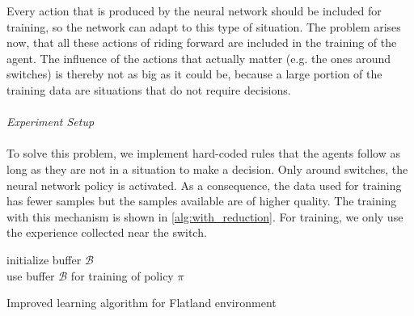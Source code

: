 Every action that is produced by the neural network should be included for training, so the network can adapt to this type of situation. The problem arises now, that all these actions of riding forward are included in the training of the agent. The influence of the actions that actually matter (e.g. the ones around switches) is thereby not as big as it could be, because a large portion of the training data are situations that do not require decisions.\\\\
\textit{Experiment Setup}\\\\
To solve this problem, we implement hard-coded rules that the agents follow as long as they are not in a situation to make a decision. Only around switches, the neural network policy is activated. As a consequence, the data used for training has fewer samples but the samples available are of higher quality. The training with this mechanism is shown in \autoref{alg:with_reduction}.
For training, we only use the experience collected near the switch.\\
\begin{algorithm}[H]
	initialize buffer $\mathcal{B}$\\
	use buffer $\mathcal{B}$ for training of policy $\pi$
	\caption{Improved learning algorithm for Flatland environment}
	\label{alg:with_reduction}
\end{algorithm}
